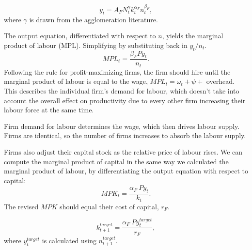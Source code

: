 \documentclass[]{article}
\begin{document}
\begin{equation}
    {y}_t= A_FN_t^\gamma k_t^{\alpha_F}n_t^{\beta_F}, \label{eqn-urban-firm-output}
\end{equation}
where $\gamma$ is drawn from the agglomeration literature.%

The output equation, differentiated with respect to  $n$, yields the marginal product of labour (MPL). Simplifying by substituting back in $y_t/n_t$. %
\begin{equation}MPL_{t} = \frac{\beta_{F}P{y}_{t}} {n_t}. \label{eqn-urban-firm-mpl}
\end{equation} 
Following the rule for profit-maximizing firms, the firm should hire until the marginal product of labour is equal to the wage, $MPL_t= {\omega_t + \psi +}$ overhead. This describes the individual firm's demand for labour, which doesn't take into account the overall effect on productivity due to every other firm increasing their labour force at the same time. 

Firm demand for labour determines the wage, which then drives labour supply. Firms are identical, so the number of firms increases to absorb the labour supply.



Firms also adjust their capital stock as the relative price of labour rises. We can compute the marginal product of capital in the same way we calculated the marginal product of labour, by differentiating the output equation with respect to capital:
\begin{equation} MPK_t = \frac{\alpha_{F}\ P{y}_{t}}{k_{t}}. \label{eqn-urban-firm-mpk}
\end{equation} 
The revised $MPK$ should equal their cost of capital, $r_F$. %

\begin{equation}k_{t+1}^{target}= \frac{\alpha_{F}\ P{y}^{target}_{t}}{r_F},\end{equation}
where  $y_t^{target}$  is calculated using $n^{target}_{t+1}$. %

\end{document}

